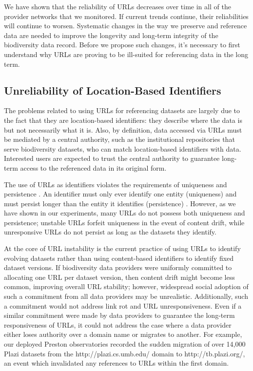 We have shown that the reliability of URLs decreases over time in all of the provider networks that we monitored. If current trends continue, their reliabilities will continue to worsen. Systematic changes in the way we preserve and reference data are needed to improve the longevity and long-term integrity of the biodiversity data record. Before we propose such changes, it's necessary to first understand why URLs are proving to be ill-suited for referencing data in the long term.

\subsection*{Unreliability of Location-Based Identifiers}
The problems related to using URLs for referencing datasets are largely due to the fact that they are location-based identifiers: they describe where the data is but not necessarily what it is. Also, by definition, data accessed via URLs must be mediated by a central authority, such as the institutional repositories that serve biodiversity datasets, who can match location-based identifiers with data. Interested users are expected to trust the central authority to guarantee long-term access to the referenced data in its original form.

The use of URLs as identifiers violates the requirements of uniqueness and persistence \citep{Paskin_1999}. An identifier must only ever identify one entity (uniqueness) and must persist longer than the entity it identifies (persistence) \citep{Paskin_1999}. However, as we have shown in our experiments, many URLs do not possess both uniqueness and persistence; unstable URLs forfeit uniqueness in the event of content drift, while unresponsive URLs do not persist as long as the datasets they identify.

At the core of URL instability is the current practice of using URLs to identify evolving datasets rather than using content-based identifiers to identify fixed dataset versions. If biodiversity data providers were uniformly committed to allocating one URL per dataset version, then content drift might become less common, improving overall URL stability; however, widespread social adoption of such a commitment from all data providers may be unrealistic. Additionally, such a commitment would not address link rot and URL unresponsiveness. Even if a similar commitment were made by data providers to guarantee the long-term responsiveness of URLs, it could not address the case where a data provider either loses authority over a domain name or migrates to another. For example, our deployed Preston observatories recorded the sudden migration of over 14,000 Plazi datasets from the http://plazi.cs.umb.edu/ domain to http://tb.plazi.org/, an event which invalidated any references to URLs within the first domain.


